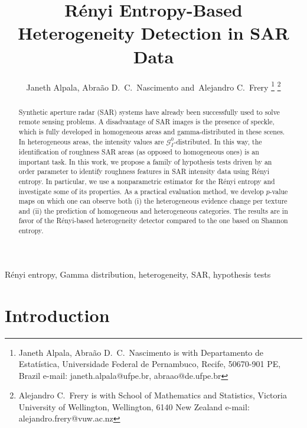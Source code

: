 \documentclass[
  journal,
]{IEEEtran}%
\title{Rényi Entropy-Based Heterogeneity Detection in SAR Data}
\author{
Janeth Alpala, Abraão D.~C.~Nascimento
and~Alejandro C.~Frery%
\thanks{Janeth Alpala, Abraão D.~C.~Nascimento is with Departamento de
Estatística, Universidade Federal de Pernambuco, Recife, 50670-901 PE,
Brazil%
 e-mail: janeth.alpala@ufpe.br, abraao@de.ufpe.br}
\thanks{Alejandro C.~Frery is with School of Mathematics and
Statistics, Victoria University of Wellington, Wellington, 6140 New
Zealand%
 e-mail: alejandro.frery@vuw.ac.nz}
}
\begin{document}


\maketitle

\begin{abstract}
Synthetic aperture radar (SAR) systems have already been successfully
used to solve remote sensing problems. A disadvantage of SAR images is
the presence of speckle, which is fully developed in homogeneous areas
and gamma-distributed in these scenes. In heterogeneous areas, the
intensity values are \(\mathcal{G}^0_I\)-distributed. In this way, the
identification of roughness SAR areas (as opposed to homogeneous ones)
is an important task. In this work, we propose a family of hypothesis
tests driven by an order parameter to identify roughness features in SAR
intensity data using Rényi entropy. In particular, we use a
nonparametric estimator for the Rényi entropy and investigate some of
its properties. As a practical evaluation method, we develop \(p\)-value
maps on which one can observe both (i) the heterogeneous evidence change
per texture and (ii) the prediction of homogeneous and heterogeneous
categories. The results are in favor of the Rényi-based heterogeneity
detector compared to the one based on Shannon entropy.
\end{abstract}
\begin{IEEEkeywords}
Rényi entropy, Gamma distribution, heterogeneity, SAR, hypothesis tests
\end{IEEEkeywords}

%


\section{Introduction}\label{introduction}
\end{document}
